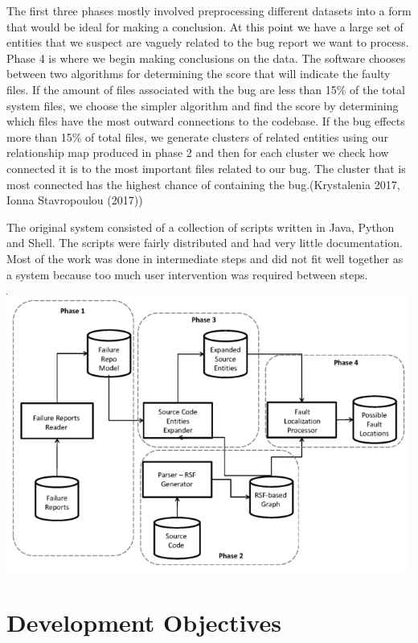\documentclass[12pt]{article}
\begin{document}
The first three phases mostly involved preprocessing different datasets
into a form that would be ideal for making a conclusion. At this point
we have a large set of entities that we suspect are vaguely related to
the bug report we want to process. Phase 4 is where we begin making
conclusions on the data. The software chooses between two algorithms for
determining the score that will indicate the faulty files. If the amount
of files associated with the bug are less than 15\% of the total system
files, we choose the simpler algorithm and find the score by determining
which files have the most outward connections to the codebase. If the
bug effects more than 15\% of total files, we generate clusters of
related entities using our relationship map produced in phase 2 and then
for each cluster we check how connected it is to the most important
files related to our bug. The cluster that is most connected has the
highest chance of containing the bug.(Krystalenia 2017, Ionna
Stavropoulou (2017))

The original system consisted of a collection of scripts written in
Java, Python and Shell. The scripts were fairly distributed and had very
little documentation. Most of the work was done in intermediate steps
and did not fit well together as a system because too much user
intervention was required between steps.

\includegraphics[width=500px]{../images/FaultPhases}

\section{Development Objectives}\label{development-objectives}
\end{document}
